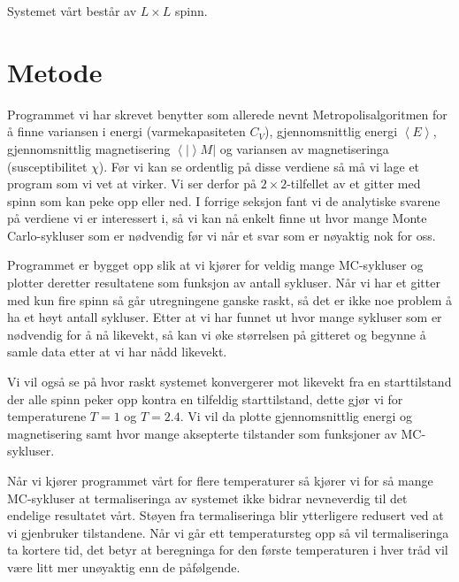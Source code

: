 \documentclass[norsk, 10pt]{article}
\def\mean#1{\left\langle #1 \right\rangle}
\begin{document}
Systemet vårt består av $L\times L$ spinn.



\section*{Metode}
Programmet vi har skrevet benytter som allerede nevnt Metropolisalgoritmen for å finne variansen i energi (varmekapasiteten $C_V$), gjennomsnittlig energi $\mean E$, gjennomsnittlig magnetisering $\mean |M|$ og variansen av magnetiseringa (susceptibilitet $\chi$). Før vi kan se ordentlig på disse verdiene så må vi lage et program som vi vet at virker. Vi ser derfor på $2\times2$-tilfellet av et gitter med spinn som kan peke opp eller ned. I forrige seksjon fant vi de analytiske svarene på verdiene vi er interessert i, så vi kan nå enkelt finne ut hvor mange Monte Carlo-sykluser som er nødvendig før vi når et svar som er nøyaktig nok for oss.

Programmet er bygget opp slik at vi kjører for veldig mange MC-sykluser og plotter deretter resultatene som funksjon av antall sykluser. Når vi har et gitter med kun fire spinn så går utregningene ganske raskt, så det er ikke noe problem å ha et høyt antall sykluser. Etter at vi har funnet ut hvor mange sykluser som er nødvendig for å nå likevekt, så kan vi øke størrelsen på gitteret og begynne å samle data etter at vi har nådd likevekt.

Vi vil også se på hvor raskt systemet konvergerer mot likevekt fra en starttilstand der alle spinn peker opp kontra en tilfeldig starttilstand, dette gjør vi for temperaturene $T=1$ og $T=2.4$. Vi vil da plotte gjennomsnittlig energi og magnetisering samt hvor mange aksepterte tilstander som funksjoner av MC-sykluser.

Når vi kjører programmet vårt for flere temperaturer så kjører vi for så mange MC-sykluser at termaliseringa av systemet ikke bidrar nevneverdig til det endelige resultatet vårt. Støyen fra termaliseringa blir ytterligere redusert ved at vi gjenbruker tilstandene. Når vi går ett temperatursteg opp så vil termaliseringa ta kortere tid, det betyr at beregninga for den første temperaturen i hver tråd vil være litt mer unøyaktig enn de påfølgende.
\end{document}
